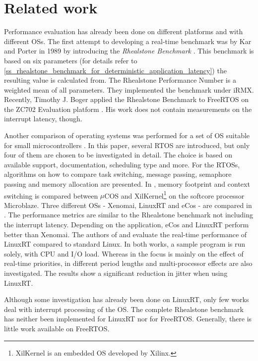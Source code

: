 \section{Related work}
Performance evaluation has already been done on different platforms and with different \acp{OS}. 
The first attempt to developing a real-time benchmark was by Kar and Porter in 1989 by introducing the \textit{Rhealstone Benchmark} \cite{kar:itrb} \cite{kar:artbp}. 
This benchmark is based on six parameters (for details refer to \ref{ss_rhealstone_benchmark_for_deterministic_application_latency}) the resulting value is calculated from.
The Rhealstone Performance Number is a weighted mean of all parameters. 
They implemented the benchmark under iRMX.
Recently, Timothy J. Boger applied the Rhealstone Benchmark to FreeRTOS on the ZC702 Evaluation platform \cite{boger:rbofatxzepp}.
His work does not contain measurements on the interrupt latency, though.
\par
Another comparison of operating systems was performed for a set of \ac{OS} suitable for small microcontrollers \cite{Anh:sapeortosfsm}. 
In this paper, several \ac{RTOS} are introduced, but only four of them are chosen to be investigated in detail.
The choice is based on available support, documentation, scheduling type and more. 
For the \acp{RTOS}, algorithms on how to compare task switching, message passing, semaphore passing and memory allocation are presented.  
In \cite{gokhan:cstamfcoxamom}, memory footprint and context switching is compared between $\mu$COS and XilKernel\footnote{XilKernel \cite{xilinx:xilkernel} is an embedded \ac{OS} developed by Xilinx.} on the softcore processor Microblaze.
Three different \acp{OS} - Xenomai, LinuxRT and eCos \cite{ecos} - are compared in \cite{Marieska:opokbaertosbaa}.
The performance metrics are similar to the Rhealstone benchmark not including the interrupt latency.
Depending on the application, eCos and LinuxRT perform better than Xenomai.
The authors of \cite{cereia:peoaemulatrp} and \cite{betz:eeotlrpfrta} evaluate the real-time performance of LinuxRT compared to standard Linux.
In both works, a sample program is run solely, with CPU and I/O load. 
Whereas in \cite{cereia:peoaemulatrp} the focus is mainly on the effect of real-time priorities, in \cite{betz:eeotlrpfrta} different period lengths and multi-processor effects are also investigated. 
The results show a significant reduction in jitter when using LinuxRT.
\par
Although some investigation has already been done on LinuxRT, only few works deal with interrupt processing of the \ac{OS}.
The complete Rhealstone benchmark has neither been implemented for LinuxRT nor for FreeRTOS.
Generally, there is little work available on FreeRTOS.

